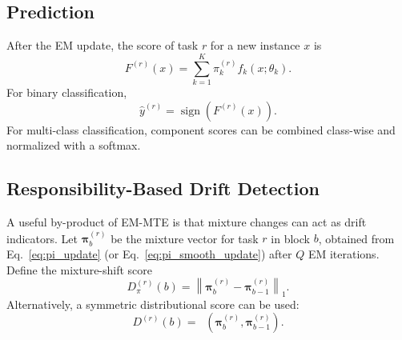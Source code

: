 ﻿\documentclass[12pt,a4paper]{article}
\DeclareMathOperator{\JS}{D_{JS}}
\begin{document}
\subsection{Prediction}
After the EM update, the score of task $r$ for a new instance $x$ is
\begin{equation}
F^{(r)}(x)=\sum_{k=1}^{K}\pi_k^{(r)}f_k(x;\theta_k).
\label{eq:ensemble_score}
\end{equation}
For binary classification,
\begin{equation}
\hat{y}^{(r)}=\operatorname{sign}(F^{(r)}(x)).
\label{eq:binary_prediction}
\end{equation}
For multi-class classification, component scores can be combined class-wise
and normalized with a softmax.


\subsection{Responsibility-Based Drift Detection}
\label{sec:drift_detection}
A useful by-product of EM-MTE is that mixture changes can act as drift
indicators. Let $\bm{\pi}_{b}^{(r)}$ be the mixture vector for task $r$ in
block $b$, obtained from Eq.~\eqref{eq:pi_update} (or
Eq.~\eqref{eq:pi_smooth_update}) after $Q$ EM iterations. Define the
mixture-shift score
\begin{equation}
	D_{\pi}^{(r)}(b)=\left\|\bm{\pi}_{b}^{(r)}-\bm{\pi}_{b-1}^{(r)}\right\|_1.
	\label{eq:l1_drift_score}
\end{equation}
Alternatively, a symmetric distributional score can be used:
\begin{equation}
	D_{\JS}^{(r)}(b)=\JS\!\left(\bm{\pi}_{b}^{(r)},\bm{\pi}_{b-1}^{(r)}\right).
	\label{eq:js_drift_score}
\end{equation}
\end{document}

